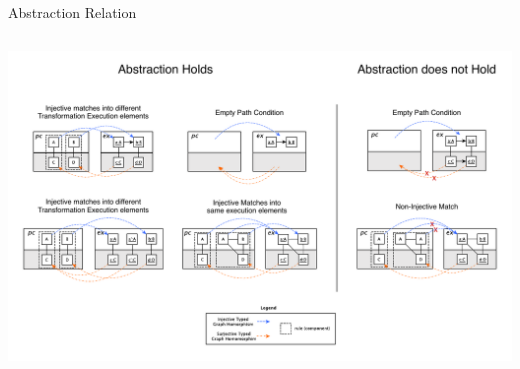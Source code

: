 \documentclass[final,hyperref={pdfpagelabels=false}]{beamer}
\begin{document}
\begin{frame}{}
\begin{columns}[t]
\begin{column}{.993\linewidth}
\begin{block}{Abstraction Relation}
\begin{columns}[t]
\begin{column}{.65\linewidth}
%                    
%                    
%                   
%                                          
%                     
%         	            

              \includegraphics[width=1\textwidth]{../figures/presentation/abstraction_relation/abstraction}\\

                    \end{column}
                 \end{columns}
                \end{block}
      		\end{column}
        \end{columns}  
                
   \begin{columns}[t]
                   \begin{column}{.485\linewidth}
                   

\end{column}
\end{columns}
\end{frame}
\end{document}
